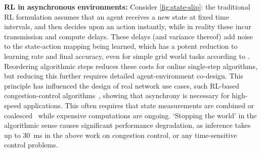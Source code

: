 \documentclass[sigconf,natbib=false]{acmart}
\newcommand{\fakepara}[1]{\noindent\textbf{#1:}}
\newcounter{insightc}
\newenvironment{insight}
	{
		\begin{tipblock}\refstepcounter{insightc}\textbf{Insight \theinsightc:}\em
	}
	{
		\end{tipblock}
	}
\begin{document}

\fakepara{RL in asynchronous environments}
Consider \cref{fig:state-slip}: the traditional RL formulation assumes that an agent receives a new state at fixed time intervals, and then decides upon an action instantly, while in reality these incur transmission and compute delays.
These delays (and variance thereof) add noise to the state-action mapping being learned, which has a potent reduction to learning rate and final accuracy, even for simple grid world tasks according to \textcite{DBLP:journals/firai/TravnikMSP18}.
Reordering algorithmic steps reduces these costs for online single-step algorithms, but reducing this further requires detailed agent-environment co-design.
This principle has influenced the design of real network use cases, such RL-based congestion-control algorithms~\parencite{DBLP:journals/corr/abs-1910-04054}, showing that asynchrony is necessary for high-speed applications.
This often requires that state measurements are combined or coalesced~\parencite{DBLP:journals/corr/abs-1910-04054,DBLP:journals/tnsm/SimpsonRP20} while expensive computations are ongoing.
`Stopping the world' in the algorithmic sense causes significant performance degradation, as inference takes up to \SI{30}{\milli\second} in the above work on congestion control, or any time-sensitive control problems.
\end{document}
